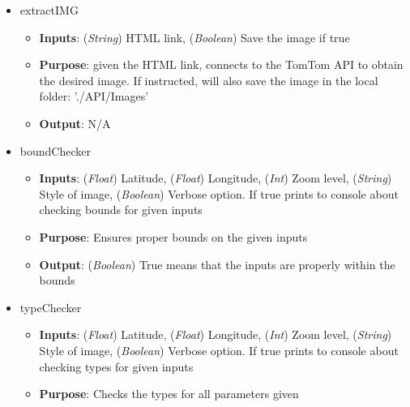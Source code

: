 \begin{itemize}

    \item extractIMG

    \begin{itemize}
        
        \item \textbf{Inputs}: (\textit{String}) HTML link, (\textit{Boolean}) Save the image if true

        \item \textbf{Purpose}: given the HTML link, connects to the TomTom API to obtain the desired image. If instructed, will also save the image in the local folder: './API/Images'

        \item \textbf{Output}: N/A

    \end{itemize}
    
    \item boundChecker

    \begin{itemize}
        
        \item \textbf{Inputs}: (\textit{Float}) Latitude, (\textit{Float}) Longitude, (\textit{Int}) Zoom level, (\textit{String}) Style of image, (\textit{Boolean}) Verbose option. If true prints to console about checking bounds for given inputs

        \item \textbf{Purpose}: Ensures proper bounds on the given inputs

        \item \textbf{Output}: (\textit{Boolean}) True means that the inputs are properly within the bounds

    \end{itemize}
    
    \item typeChecker

    \begin{itemize}
        
        \item \textbf{Inputs}: (\textit{Float}) Latitude, (\textit{Float}) Longitude, (\textit{Int}) Zoom level, (\textit{String}) Style of image, (\textit{Boolean}) Verbose option. If true prints to console about checking types for given inputs

        \item \textbf{Purpose}: Checks the types for all parameters given


\end{itemize}
\end{itemize}
